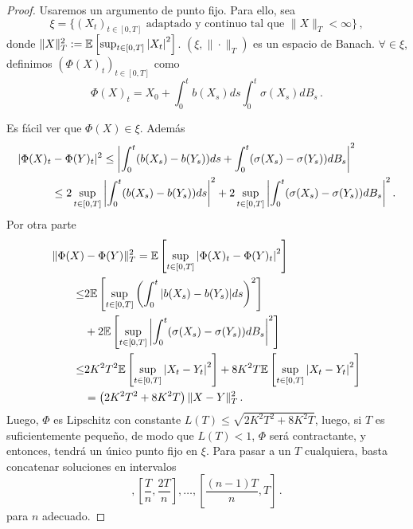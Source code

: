 \begin{proof}
\gris
Usaremos un argumento de punto fijo. Para ello, sea
\begin{equation*}
    \xi = \{ (X_t)_{t \in [0,T]} \text{ adaptado y continuo tal que }  \|X\|_T < \infty \}\,,
\end{equation*}
donde $\|X\|_{T}^{2} := \mathbb{E} \left[ \sup_{t \in [0,T]} \abs{X_t}^{2} \right] $. $(\xi, \| \cdot \|_{T})$ es un espacio de Banach. $\forall \in \xi$, definimos $(\Phi(X)_t)_{t \in [0,T]}$ como
\begin{equation*}
        \Phi(X)_t = X_0 + \int_{0}^{t} b(X_s) ds  \int_{0}^{t} \sigma(X_s) dB_s\,.
\end{equation*}

Es fácil ver que $\Phi(X) \in \xi$. Además 
\begin{align*}
    | \Phi(X)_t & -  \Phi(Y)_{t}|^2 \le \abs{ \int_{0}^{t} (b(X_s) -b(Y_s))ds + \int_{0}^{t}(\sigma(X_s) - \sigma(Y_s)) dB_s}^2 \\
    & \le 2\sup_{t \in [0,T]} \abs{ \int_{0}^{t} (b(X_s) -b(Y_s))ds}^2 + 2\sup_{t \in [0,T]} \abs{  \int_{0}^{t}(\sigma(X_s) - \sigma(Y_s)) dB_s}^2\,.
\end{align*}
Por otra parte
\begin{align*}
    \|\Phi(X) &- \Phi(Y)\|_{T}^{2} = \mathbb{E} \left[ \sup_{t \in [0,T]} \abs{\Phi(X)_{t} - \Phi(Y)_{t}}^2 \right] \\ 
    \le & 2 \mathbb{E} \left[ \sup_{t \in [0,T]} \left( \int_{0}^{t} \abs{b(X_s) -b(Y_s)}ds \right)^2 \right] \\
     & + 2 \mathbb{E} \left[\sup_{t \in [0,T]} \abs{ \int_{0}^{t} (\sigma(X_s) -\sigma(Y_s))dB_s}^2 \right] \\
    \le & 2 K^2T^2\mathbb{E} \left[\sup_{t \in [0,T]} \abs{ X_t -Y_t }^2 \right] + 8 K^2 T \mathbb{E} \left[ \sup_{t \in [0,T]} \abs{X_t - Y_t}^2\right] \\
    &= \left( 2K^2 T^2 + 8K^2 T \right) \| X-Y \|_{T}^{2}\,.
\end{align*}
Luego, $\Phi$ es Lipschitz con constante $L(T) \le \sqrt{2 K^2 T^2 + 8 K^2 T}$, luego, si $T$ es suficientemente pequeño, de modo que $L(T)<1$, $\Phi$ será contractante, y entonces, tendrá un único punto fijo en $\xi$. Para pasar a un $T$ cualquiera, basta concatenar soluciones en intervalos
\begin{equation*}
    [0,\frac{T}{n}], [\frac{T}{n}, \frac{2T}{n}], \ldots, [\frac{(n-1)T}{n},T]\,.
\end{equation*}
para $n$ adecuado.
\findem
\negro
\end{proof}

